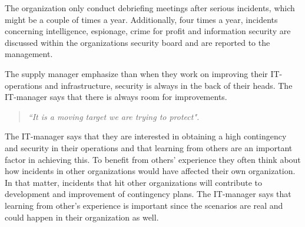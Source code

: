 The organization only conduct debriefing meetings after serious incidents, which might be a couple of times a year. Additionally, four times a year, incidents concerning intelligence, espionage, crime for profit and information security are discussed within the organizations security board and are reported to the management. 

The supply manager emphasize than when they work on improving their IT-operations and infrastructure, security is always in the back of their heads. The IT-manager says that there is always room for improvements. 
\begin{quote}
\textit{``It is a moving target we are trying to protect".}
\end{quote}

The IT-manager says that they are interested in obtaining a high contingency and security in their operations and that learning from others are an important factor in achieving this. To benefit from others' experience they often think about how incidents in other organizations would have affected their own organization. In that matter, incidents that hit other organizations will contribute to development and improvement of contingency plans. The IT-manager says that learning from other's experience is important since the scenarios are real and could happen in their organization as well.